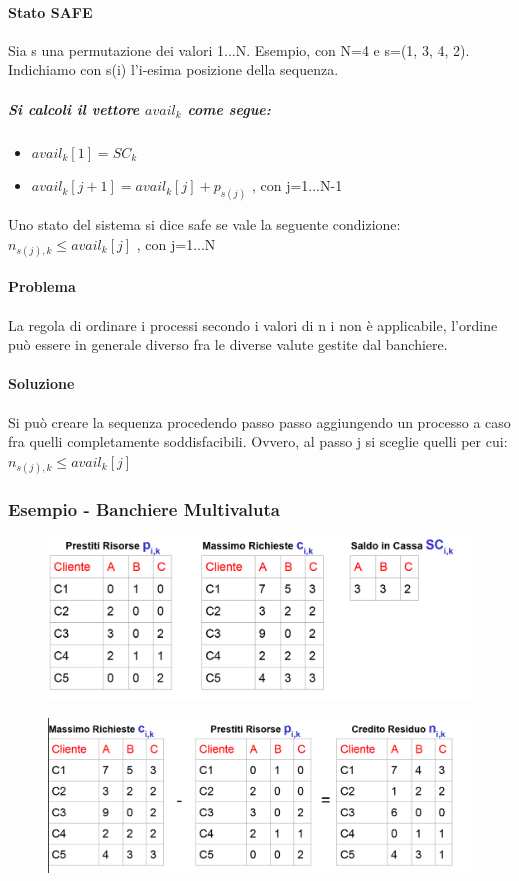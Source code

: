 \paragraph{Stato SAFE}

Sia s una permutazione dei valori 1...N. Esempio, con N=4 e s=(1, 3, 4, 2).
Indichiamo con s(i) l'i-esima posizione della sequenza.
\subparagraph{Si calcoli il vettore $avail_k$ come segue:}
\begin{itemize}
    \item $avail_k[1] = SC_k$
    \item $avail_k[j+1] = avail_k[j] + p_{s(j)}$ , con j=1...N-1
\end{itemize}

Uno stato del sistema si dice safe se vale la seguente condizione: $n_{s(j),k} \le avail_k[j]$ , con j=1...N

\paragraph{Problema} La regola di ordinare i processi secondo i valori di n i non è applicabile, l'ordine può essere in generale diverso fra le diverse valute gestite dal banchiere.
\paragraph{Soluzione}Si può creare la sequenza procedendo passo passo aggiungendo un processo a caso fra quelli completamente soddisfacibili. Ovvero, al passo j si sceglie quelli per cui: $n_{s(j),k} \le avail_k[j]$

\subsubsection{Esempio - Banchiere Multivaluta}

\begin{figure} [h]
    \centering
    \includegraphics[width=0.65\linewidth]{Images/Screenshot 2025-01-15 122610.png}
\end{figure}

\begin{figure} [h]
    \centering
    \includegraphics[width=0.65\linewidth]{Images/Screenshot 2025-01-15 122705.png}
\end{figure}

